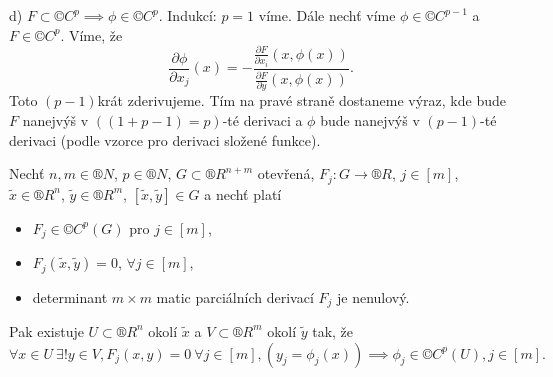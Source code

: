 \documentclass[12pt]{article}					%
\begin{document}
\begin{veta}
\begin{dukazin}
			d) $F \subset ©C^p \implies \phi \in ©C^p$. Indukcí: $p = 1$ víme. Dále nechť víme $\phi \in ©C^{p-1}$ a $F \in ©C^p$. Víme, že
			$$ \frac{\partial \phi}{\partial x_j}(x) = - \frac{\frac{\partial F}{\partial x_i}(x, \phi(x))}{\frac{\partial F}{\partial y}(x, \phi(x))}. $$
			Toto $(p-1)$krát zderivujeme. Tím na pravé straně dostaneme výraz, kde bude $F$ nanejvýš v $((1 + p-1) = p)$-té derivaci a $\phi$ bude nanejvýš v $(p-1)$-té derivaci (podle vzorce pro derivaci složené funkce).
		\end{dukazin}
	\end{veta}


	\begin{veta}
		Nechť $n, m \in ®N$, $p \in ®N$, $G \subset ®R^{n + m}$ otevřená, $F_j: G \rightarrow ®R$, $j \in [m]$, $\tilde{x} \in ®R^n$, $\tilde{y} \in ®R^m$, $[\tilde x, \tilde y] \in G$ a nechť platí
		
		\begin{itemize}
			\item $F_j \in ©C^p(G)$ pro $j \in [m]$,
			\item $F_j(\tilde x, \tilde y) = 0$, $\forall j \in [m]$,
			\item determinant $m \times m$ matic parciálních derivací $F_j$ je nenulový.
		\end{itemize}

		Pak existuje $U \subset ®R^n$ okolí $\tilde x$ a $V \subset ®R^m$ okolí $\tilde y$ tak, že
		$$ \forall x \in U\ \exists! y \in V, F_j(x, y) = 0\ \forall j \in [m], (y_j = \phi_j(x)) \implies \phi_j \in ©C^p(U), j \in [m]. $$
	\end{veta}
\end{document}
